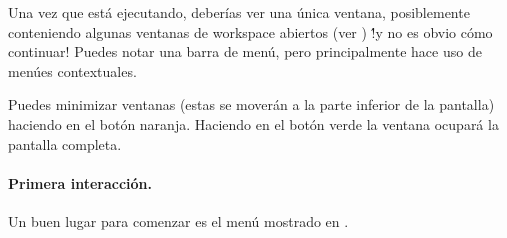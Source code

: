 \documentclass[a4paper,10pt,twoside]{book}
\begin{document}
Una vez que \pharo est\'a ejecutando, deber\'ias ver una \'unica ventana, posiblemente conteniendo algunas ventanas de workspace abiertos (ver ) \'!y no es obvio c\'omo continuar!
Puedes notar una barra de men\'u, pero principalmente \pharo hace uso de men\'ues contextuales.


Puedes minimizar ventanas (estas se mover\'an a la parte inferior de la pantalla) haciendo \click en el bot\'on naranja. Haciendo \click en el bot\'on verde la ventana ocupar\'a la pantalla completa.

\paragraph{Primera interacci\'on.}

Un buen lugar para comenzar es el men\'u  mostrado en .


\end{document}
